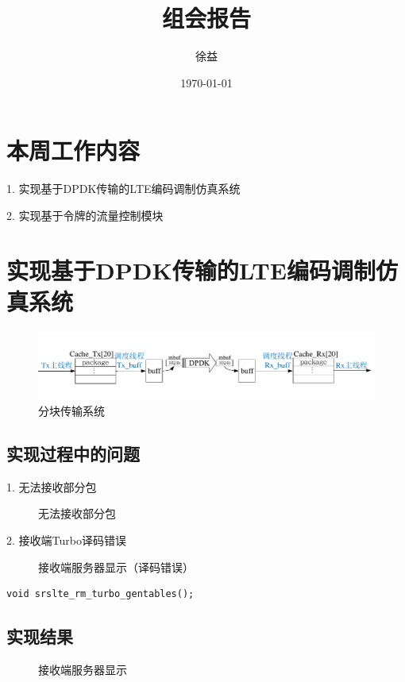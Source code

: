 \documentclass{article}
\title{组会报告}
\author{徐益}
\date{\today}
\begin{document}
	
\maketitle


\section{本周工作内容}

1. 实现基于DPDK传输的LTE编码调制仿真系统

2. 实现基于令牌的流量控制模块

\section{实现基于DPDK传输的LTE编码调制仿真系统}
\begin{figure}[H]
	\centering
	\includegraphics[width = \textwidth]{frame_sys.pdf}
	\caption{分块传输系统}
\end{figure}
\subsection{实现过程中的问题}
1. 无法接收部分包
\begin{figure}[H]
	\centering
	\caption{无法接收部分包}
\end{figure}
2. 接收端Turbo译码错误
\begin{figure}[H]
	\centering
	\caption{接收端服务器显示（译码错误）}
\end{figure}
\begin{lstlisting}
void srslte_rm_turbo_gentables();
\end{lstlisting}

\subsection{实现结果}
\begin{figure}[H]
	\centering
	\caption{接收端服务器显示}
\end{figure}
\end{document}
